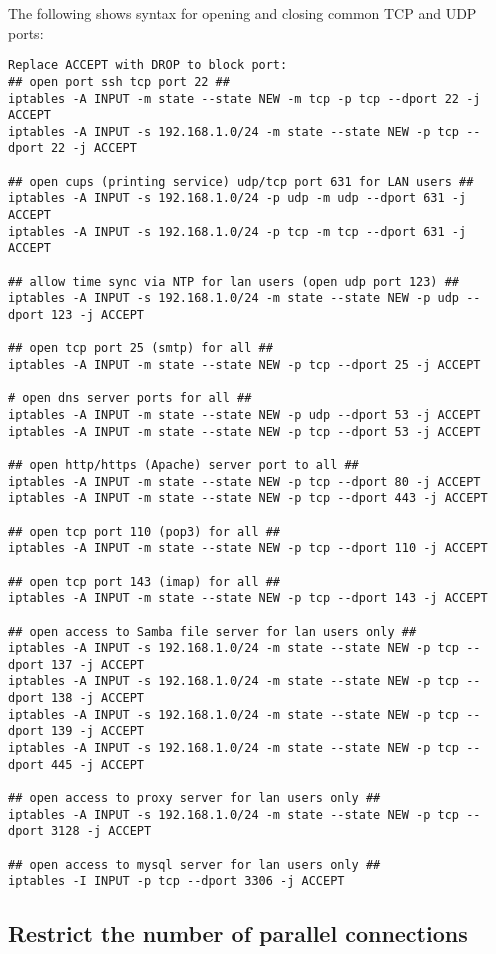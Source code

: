 \documentclass[dvipdfm]{book}
\begin{document}
The following shows syntax for opening and closing common TCP and UDP ports:
 
\begin{verbatim}
Replace ACCEPT with DROP to block port:
## open port ssh tcp port 22 ##
iptables -A INPUT -m state --state NEW -m tcp -p tcp --dport 22 -j ACCEPT
iptables -A INPUT -s 192.168.1.0/24 -m state --state NEW -p tcp --dport 22 -j ACCEPT
 
## open cups (printing service) udp/tcp port 631 for LAN users ##
iptables -A INPUT -s 192.168.1.0/24 -p udp -m udp --dport 631 -j ACCEPT
iptables -A INPUT -s 192.168.1.0/24 -p tcp -m tcp --dport 631 -j ACCEPT
 
## allow time sync via NTP for lan users (open udp port 123) ##
iptables -A INPUT -s 192.168.1.0/24 -m state --state NEW -p udp --dport 123 -j ACCEPT
 
## open tcp port 25 (smtp) for all ##
iptables -A INPUT -m state --state NEW -p tcp --dport 25 -j ACCEPT
 
# open dns server ports for all ##
iptables -A INPUT -m state --state NEW -p udp --dport 53 -j ACCEPT
iptables -A INPUT -m state --state NEW -p tcp --dport 53 -j ACCEPT
 
## open http/https (Apache) server port to all ##
iptables -A INPUT -m state --state NEW -p tcp --dport 80 -j ACCEPT
iptables -A INPUT -m state --state NEW -p tcp --dport 443 -j ACCEPT
 
## open tcp port 110 (pop3) for all ##
iptables -A INPUT -m state --state NEW -p tcp --dport 110 -j ACCEPT
 
## open tcp port 143 (imap) for all ##
iptables -A INPUT -m state --state NEW -p tcp --dport 143 -j ACCEPT
 
## open access to Samba file server for lan users only ##
iptables -A INPUT -s 192.168.1.0/24 -m state --state NEW -p tcp --dport 137 -j ACCEPT
iptables -A INPUT -s 192.168.1.0/24 -m state --state NEW -p tcp --dport 138 -j ACCEPT
iptables -A INPUT -s 192.168.1.0/24 -m state --state NEW -p tcp --dport 139 -j ACCEPT
iptables -A INPUT -s 192.168.1.0/24 -m state --state NEW -p tcp --dport 445 -j ACCEPT
 
## open access to proxy server for lan users only ##
iptables -A INPUT -s 192.168.1.0/24 -m state --state NEW -p tcp --dport 3128 -j ACCEPT
 
## open access to mysql server for lan users only ##
iptables -I INPUT -p tcp --dport 3306 -j ACCEPT
\end{verbatim}

\subsection{Restrict the number of parallel connections}
\end{document}
